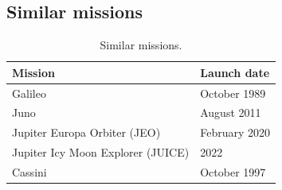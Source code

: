 












\subsection{Similar missions}

\begin{longtable}{ll}
  \caption{Similar missions.} \\

  Mission & Launch date \\ \midrule

  Galileo & October 1989 \\

  Juno & August 2011 \\

  Jupiter Europa Orbiter (JEO) & February 2020 \\

  Jupiter Icy Moon Explorer (JUICE) & 2022 \\

  Cassini & October 1997 \\
\end{longtable}

